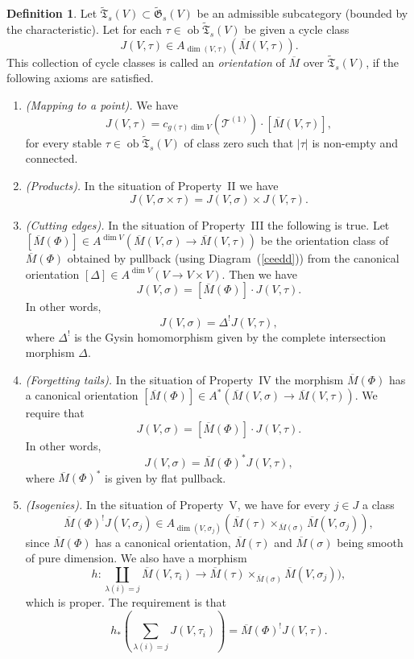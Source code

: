 \documentclass[11pt]{amsart}
\theoremstyle{definition}
\newtheorem{defn}[prop]{Definition}
\theoremstyle{remark}
\renewcommand{\tilde}{\widetilde}
\newcommand{\upst}{^{\ast}}
\newcommand{\upsh}{^{!}}
\newcommand{\lst}{_{\ast}}
\newcommand{\TT}{{\mathfrak{T}}}
\newcommand{\GG}{{\mathfrak{G}}}
\newcommand{\tT}{{\mathcal{T}}}
\newcommand{\ob}{\operatorname{ob}}
\newcommand{\ol}{\overline}
\theoremstyle{plain}
\theoremstyle{definition}
\theoremstyle{remark}
\begin{document}
\begin{defn} \label{domb}
Let \(\tilde{\TT}_s(V)\subset\tilde{\GG}_s(V)\) be an admissible subcategory
(bounded by the characteristic). Let for each
\(\tau\in\ob\tilde{\TT}_s(V)\) be given a cycle class
\[
J(V,\tau)\in A_{\dim(V,\tau)}(\ol{M}(V,\tau)).
\]
This collection of cycle classes is called an {\em orientation } of \(\ol{M}\)
over \(\tilde{\TT}_s(V)\), if the following
axioms are satisfied.
\begin{enumerate}
\item \label{domb1} {\em (Mapping to a point). }We have
\[
J(V,\tau)=c_{g(\tau)\dim V}(\tT^{(1)})\cdot[\ol{M}(V,\tau)],
\]
for every stable \(\tau\in\ob\tilde{\TT}_s(V)\) of class zero such that \(|\tau|\)
is non-empty and connected.
\item \label{domb2} {\em (Products). }In the situation of Property~II we have
\[
J(V,\sigma\times\tau)=J(V,\sigma)\times J(V,\tau).
\]
\item \label{domb3} {\em (Cutting edges). }In the situation of Property~III the
following is true. Let \([\ol{M}(\Phi)]\in
A^{\dim V}(\ol{M}(V,\sigma)\rightarrow\ol{M}(V,\tau))\) be the orientation class
of \(\ol{M}(\Phi)\) obtained by pullback
(using Diagram~(\ref{ceedd})) from the canonical orientation \([\Delta]\in
A^{\dim V}(V\rightarrow V\times V)\). Then we
have
\[
J(V,\sigma)=[\ol{M}(\Phi)]\cdot J(V,\tau).
\]
In other words,
\[
J(V,\sigma)=\Delta\upsh J(V,\tau),
\]
where \(\Delta\upsh\) is the Gysin homomorphism given by the complete
intersection morphism \(\Delta\).
\item \label{domb4} {\em (Forgetting tails). }In the situation of Property~IV
the morphism \(\ol{M}(\Phi)\) has a canonical
orientation \([\ol{M}(\Phi)]\in
A\upst(\ol{M}(V,\sigma)\rightarrow\ol{M}(V,\tau))\). We require that
\[
J(V,\sigma)=[\ol{M}(\Phi)]\cdot J(V,\tau).
\]
In other words,
\[
J(V,\sigma)=\ol{M}(\Phi)\upst J(V,\tau),
\]
where \(\ol{M}(\Phi)\upst\) is given by flat pullback.
\item \label{domb5} {\em (Isogenies). }In the situation of Property~V, we have
for every \(j\in J\) a class
\[
\ol{M}(\Phi)\upsh J(V,\sigma_j)\in
A_{\dim(V,\sigma_j)}(\ol{M}(\tau)\times_{\ol{M}(\sigma)}\ol{M}(V,\sigma_j)),
\]
since \(\ol{M}(\Phi)\) has a canonical orientation, \(\ol{M}(\tau)\) and
\(\ol{M}(\sigma)\) being smooth of pure dimension. We
also have a morphism
\[
h:\coprod_{\lambda(i)=j}\ol{M}(V,\tau_i)\longrightarrow\ol{M}(
\tau)\times_{\ol{M}(
\sigma)}\ol{M}(V,\sigma_j)),
\]
which is proper. The requirement is that
\[
h\lst(\sum_{\lambda(i)=j}J(V,\tau_i))=\ol{M}(\Phi)\upsh J(V,\tau).
\]
\end{enumerate}
\end{defn}
\end{document}
